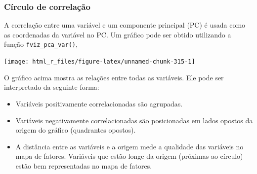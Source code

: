 \documentclass[
]{book}
\newenvironment{Shaded}{\begin{snugshade}}{\end{snugshade}}
\newcommand{\DataTypeTok}[1]{\textcolor[rgb]{0.13,0.29,0.53}{#1}}
\newcommand{\KeywordTok}[1]{\textcolor[rgb]{0.13,0.29,0.53}{\textbf{#1}}}
\newcommand{\NormalTok}[1]{#1}
\newcommand{\OtherTok}[1]{\textcolor[rgb]{0.56,0.35,0.01}{#1}}
\newcommand{\StringTok}[1]{\textcolor[rgb]{0.31,0.60,0.02}{#1}}
\providecommand{\tightlist}{%
  \setlength{\itemsep}{0pt}\setlength{\parskip}{0pt}}
\begin{document}
\hypertarget{cuxedrculo-de-correlauxe7uxe3o}{%
\subsubsection{Círculo de correlação}\label{cuxedrculo-de-correlauxe7uxe3o}}

A correlação entre uma variável e um componente principal (PC) é usada como as coordenadas da variável no PC. Um gráfico pode ser obtido utilizando a função \texttt{fviz\_pca\_var()}, 

\begin{Shaded}
\end{Shaded}

\begin{center}\texttt{[image: html\_r\_files/figure-latex/unnamed-chunk-315-1]} \end{center}

O gráfico acima mostra as relações entre todas as variáveis. Ele pode ser interpretado da seguinte forma:

\begin{itemize}
\tightlist
\item
  Variáveis positivamente correlacionadas são agrupadas.
\item
  Variáveis negativamente correlacionadas são posicionadas em lados opostos da origem do gráfico (quadrantes opostos).
\item
  A distância entre as variáveis e a origem mede a qualidade das variáveis no mapa de fatores. Variáveis que estão longe da origem (próximas ao círculo) estão bem representadas no mapa de fatores.
\end{itemize}
\end{document}
